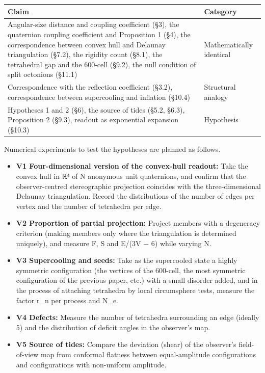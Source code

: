 \documentclass[
  a4paper,
]{article}
\newcounter{none} %
\providecommand{\tightlist}{%
  \setlength{\itemsep}{0pt}\setlength{\parskip}{0pt}}
\begin{document}
{\def\LTcaptype{none} %
\begin{longtable}[]{@{}
  >{\raggedright\arraybackslash}p{}
  >{\raggedright\arraybackslash}p{}@{}}
\toprule\noalign{}
\begin{minipage}[b]{\linewidth}\raggedright
Claim
\end{minipage} & \begin{minipage}[b]{\linewidth}\raggedright
Category
\end{minipage} \\
\midrule\noalign{}
\endhead
\bottomrule\noalign{}
\endlastfoot
Angular-size distance and coupling coefficient (§3), the quaternion
coupling coefficient and Proposition 1 (§4), the correspondence between
convex hull and Delaunay triangulation (§7.2), the rigidity count
(§8.1), the tetrahedral gap and the 600-cell (§9.2), the null condition
of split octonions (§11.1) & Mathematically identical \\
Correspondence with the reflection coefficient (§3.2), correspondence
between supercooling and inflation (§10.4) & Structural analogy \\
Hypotheses 1 and 2 (§6), the source of tides (§5.2, §6.3), Proposition 2
(§9.3), readout as exponential expansion (§10.3) & Hypothesis \\
\end{longtable}
}

Numerical experiments to test the hypotheses are planned as follows.

\begin{itemize}
\tightlist
\item
  \textbf{V1 Four-dimensional version of the convex-hull readout:} Take
  the convex hull in ℝ⁴ of N anonymous unit quaternions, and confirm
  that the observer-centred stereographic projection coincides with the
  three-dimensional Delaunay triangulation. Record the distributions of
  the number of edges per vertex and the number of tetrahedra per edge.
\item
  \textbf{V2 Proportion of partial projection:} Project members with a
  degeneracy criterion (making members only where the triangulation is
  determined uniquely), and measure F, S and E/(3V − 6) while varying N.
\item
  \textbf{V3 Supercooling and seeds:} Take as the supercooled state a
  highly symmetric configuration (the vertices of the 600-cell, the most
  symmetric configuration of the previous paper, etc.) with a small
  disorder added, and in the process of attaching tetrahedra by local
  circumsphere tests, measure the factor r\_n per process and N\_e.
\item
  \textbf{V4 Defects:} Measure the number of tetrahedra surrounding an
  edge (ideally 5) and the distribution of deficit angles in the
  observer's map.
\item
  \textbf{V5 Source of tides:} Compare the deviation (shear) of the
  observer's field-of-view map from conformal flatness between
  equal-amplitude configurations and configurations with non-uniform
  amplitude.
\end{itemize}
\end{document}
